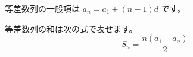 \documentclass{jlreq}
\begin{document}
等差数列の一般項は $a_{n}=a_{1}+(n-1)d$ です。

等差数列の和は次の式で表せます。
\[
  S_{n}=\frac{n(a_{1}+a_{n})}{2}
\]
\end{document}
